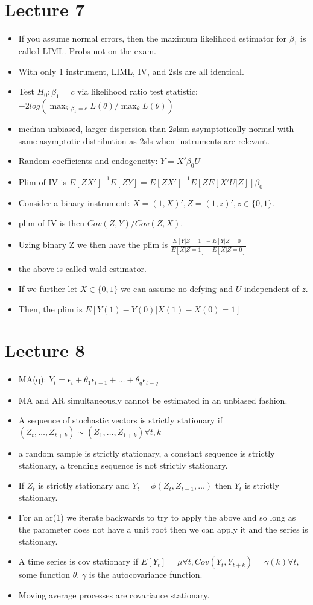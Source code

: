 \documentclass[11pt]{article} %
\begin{document}
\section{Lecture 7}
\begin{itemize}
\item If you assume normal errors, then the maximum likelihood estimator for $\beta_1$ is called LIML. Probs not on the exam.
\item With only 1 instrument, LIML, IV, and 2sls are all identical. 
\item Test $H_0: \beta_1 = c$ via likelihood ratio test statistic: $-2log(\max_{\theta:\beta_1=c}L(\theta)/\max_{\theta}L(\theta))$
\item median unbiased, larger dispersion than 2slsm asymptotically normal with same asymptotic distribution as 2sls when instruments are relevant.
\item Random coefficients and endogeneity: $Y=X'\beta_0 U$
\item Plim of IV is $E[ZX']^{-1}E[ZY] = E[ZX']^{-1}E[ZE[X'U|Z]]\beta_0$
\item Consider a binary instrument: $X = (1,X)',Z = (1,z)', z\in\{ 0,1\}$.
\item plim of IV is then $Cov(Z,Y)/Cov(Z,X)$.
\item Uzing binary Z we then have the plim is $\frac{E[Y|Z=1] - E[Y|Z=0]}{E[X|Z=1]-E[X|Z=0]}$
\item the above is called wald estimator.
\item If we further let $X\in\{ 0,1\}$ we can assume no defying and $U$ independent of $z$.
\item Then, the plim is $E[Y(1) - Y(0)|X(1) - X(0) = 1]$
\end{itemize}
\section{Lecture 8}
\begin{itemize}
\item MA(q): $Y_t = \epsilon_t + \theta_1\epsilon_{t-1} + \dots + \theta_q \epsilon_{t-q}$
\item MA and AR simultaneously cannot be estimated in an unbiased fashion.
\item A sequence of stochastic vectors is strictly stationary if $(Z_t,\dots,Z_{t+k}) \sim (Z_1,\dots,Z_{1+k}) \forall t,k$
\item a random sample is strictly stationary, a constant sequence is strictly stationary, a trending sequence is not strictly stationary.
\item If $Z_t$ is strictly stationary and $Y_t = \phi(Z_t,Z_{t-1},\dots)$ then $Y_t$ is strictly stationary.
\item For an ar(1) we iterate backwards to try to apply the above and so long as the parameter does not have a unit root then we can apply it and the series is stationary.
\item A time series is cov stationary if $E[Y_t] = \mu \forall t, Cov(Y_t,Y_{t+k}) = \gamma(k) \forall t$, some function $\theta$. $\gamma$ is the autocovariance function.
\item Moving average processes are covariance stationary.
\end{itemize}
\end{document}
